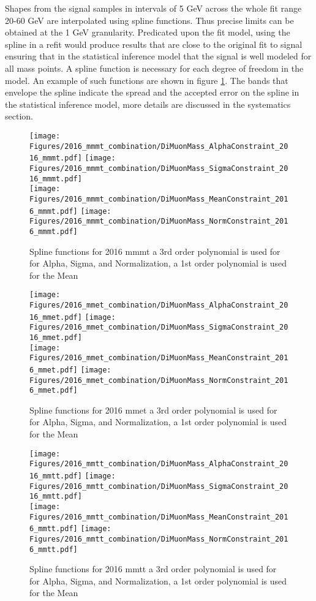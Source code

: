Shapes from the signal samples in intervals of 5 GeV across the whole fit range 20-60 GeV are interpolated using spline functions. Thus precise limits can be obtained at the 1 GeV granularity. Predicated upon the fit model, using the spline in a refit would produce results that are close to the original fit to signal ensuring that in the statistical inference model that the signal is well modeled for all mass points. A spline function is necessary for each degree of freedom in the model. An example of such functions are shown in figure \ref{fig:spline_2016_mmmt}. The bands that envelope the spline indicate the spread and the accepted error on the spline in the statistical inference model, more details are discussed in the systematics section.  
\begin{figure}[ht!b]
    \centering 
    \texttt{[image: Figures/2016\_mmmt\_combination/DiMuonMass\_AlphaConstraint\_2016\_mmmt.pdf]}
    \texttt{[image: Figures/2016\_mmmt\_combination/DiMuonMass\_SigmaConstraint\_2016\_mmmt.pdf]}\\
    \texttt{[image: Figures/2016\_mmmt\_combination/DiMuonMass\_MeanConstraint\_2016\_mmmt.pdf]}
    \texttt{[image: Figures/2016\_mmmt\_combination/DiMuonMass\_NormConstraint\_2016\_mmmt.pdf]}\\
    \caption{\label{fig:spline_2016_mmmt} Spline functions for 2016 mmmt a 3rd order polynomial is used for  for Alpha, Sigma, and Normalization, a 1st order polynomial is used for the Mean}
\end{figure}
\begin{figure}[ht!b]
    \centering 
    \texttt{[image: Figures/2016\_mmet\_combination/DiMuonMass\_AlphaConstraint\_2016\_mmet.pdf]}
    \texttt{[image: Figures/2016\_mmet\_combination/DiMuonMass\_SigmaConstraint\_2016\_mmet.pdf]}\\
    \texttt{[image: Figures/2016\_mmet\_combination/DiMuonMass\_MeanConstraint\_2016\_mmet.pdf]}
    \texttt{[image: Figures/2016\_mmet\_combination/DiMuonMass\_NormConstraint\_2016\_mmet.pdf]}\\
    \caption{\label{fig:spline_2016_mmet} Spline functions for 2016 mmet a 3rd order polynomial is used for  for Alpha, Sigma, and Normalization, a 1st order polynomial is used for the Mean}
\end{figure}
\begin{figure}[ht!b]
    \centering 
    \texttt{[image: Figures/2016\_mmtt\_combination/DiMuonMass\_AlphaConstraint\_2016\_mmtt.pdf]}
    \texttt{[image: Figures/2016\_mmtt\_combination/DiMuonMass\_SigmaConstraint\_2016\_mmtt.pdf]}\\
    \texttt{[image: Figures/2016\_mmtt\_combination/DiMuonMass\_MeanConstraint\_2016\_mmtt.pdf]}
    \texttt{[image: Figures/2016\_mmtt\_combination/DiMuonMass\_NormConstraint\_2016\_mmtt.pdf]}\\
    \caption{\label{fig:spline_2016_mmtt} Spline functions for 2016 mmtt a 3rd order polynomial is used for  for Alpha, Sigma, and Normalization, a 1st order polynomial is used for the Mean}
\end{figure}
